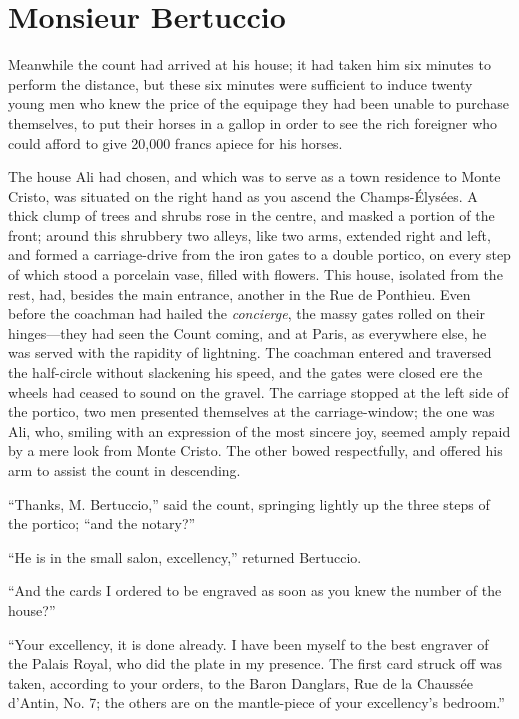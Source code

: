 \chapter{Monsieur Bertuccio}

Meanwhile the count had arrived at his house; it had taken him six
minutes to perform the distance, but these six minutes were sufficient
to induce twenty young men who knew the price of the equipage they had
been unable to purchase themselves, to put their horses in a gallop in
order to see the rich foreigner who could afford to give 20,000 francs
apiece for his horses.

The house Ali had chosen, and which was to serve as a town residence to
Monte Cristo, was situated on the right hand as you ascend the
Champs-Élysées. A thick clump of trees and shrubs rose in the centre,
and masked a portion of the front; around this shrubbery two alleys,
like two arms, extended right and left, and formed a carriage-drive
from the iron gates to a double portico, on every step of which stood a
porcelain vase, filled with flowers. This house, isolated from the
rest, had, besides the main entrance, another in the Rue de Ponthieu.
Even before the coachman had hailed the \textit{concierge}, the massy gates
rolled on their hinges—they had seen the Count coming, and at Paris, as
everywhere else, he was served with the rapidity of lightning. The
coachman entered and traversed the half-circle without slackening his
speed, and the gates were closed ere the wheels had ceased to sound on
the gravel. The carriage stopped at the left side of the portico, two
men presented themselves at the carriage-window; the one was Ali, who,
smiling with an expression of the most sincere joy, seemed amply repaid
by a mere look from Monte Cristo. The other bowed respectfully, and
offered his arm to assist the count in descending.

“Thanks, M. Bertuccio,” said the count, springing lightly up the three
steps of the portico; “and the notary?”

“He is in the small salon, excellency,” returned Bertuccio.

“And the cards I ordered to be engraved as soon as you knew the number
of the house?”

“Your excellency, it is done already. I have been myself to the best
engraver of the Palais Royal, who did the plate in my presence. The
first card struck off was taken, according to your orders, to the Baron
Danglars, Rue de la Chaussée d’Antin, No. 7; the others are on the
mantle-piece of your excellency’s bedroom.”

